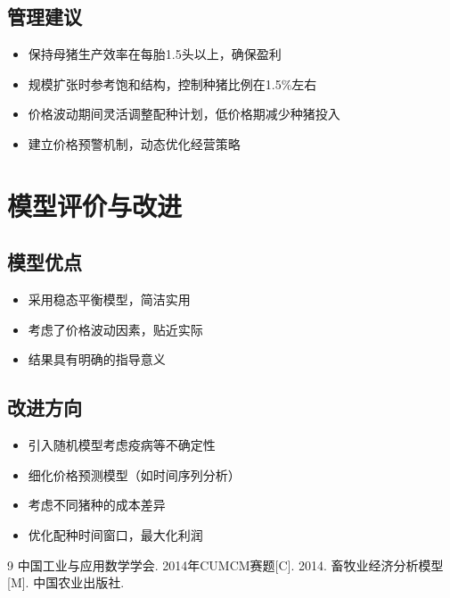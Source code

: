 \documentclass[12pt,a4paper]{article}
\begin{document}
\subsection{管理建议}
\begin{itemize}
    \item 保持母猪生产效率在每胎1.5头以上，确保盈利
    \item 规模扩张时参考饱和结构，控制种猪比例在1.5\%左右
    \item 价格波动期间灵活调整配种计划，低价格期减少种猪投入
    \item 建立价格预警机制，动态优化经营策略
\end{itemize}

\section{模型评价与改进}

\subsection{模型优点}
\begin{itemize}
    \item 采用稳态平衡模型，简洁实用
    \item 考虑了价格波动因素，贴近实际
    \item 结果具有明确的指导意义
\end{itemize}

\subsection{改进方向}
\begin{itemize}
    \item 引入随机模型考虑疫病等不确定性
    \item 细化价格预测模型（如时间序列分析）
    \item 考虑不同猪种的成本差异
    \item 优化配种时间窗口，最大化利润
\end{itemize}

\begin{thebibliography}{9}
 中国工业与应用数学学会. 2014年CUMCM赛题[C]. 2014.
 畜牧业经济分析模型[M]. 中国农业出版社.
\end{thebibliography}
\end{document}
